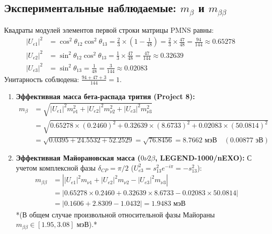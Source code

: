 \documentclass[12pt,a4paper]{article}
\begin{document}
	\subsection{Экспериментальные наблюдаемые: $m_\beta$ и $m_{\beta\beta}$}
	Квадраты модулей элементов первой строки матрицы PMNS равны:
	\begin{align}
		|U_{e1}|^2 &= \cos^2\theta_{12} \cos^2\theta_{13} = \frac{2}{3} \times \left(1 - \frac{1}{48}\right) = \frac{2}{3} \times \frac{47}{48} = \frac{94}{144} \approx \mathbf{0.65278} \\
		|U_{e2}|^2 &= \sin^2\theta_{12} \cos^2\theta_{13} = \frac{1}{3} \times \frac{47}{48} = \frac{47}{144} \approx \mathbf{0.32639} \\
		|U_{e3}|^2 &= \sin^2\theta_{13} = \frac{1}{48} = \frac{3}{144} \approx \mathbf{0.02083}
	\end{align}
	Унитарность соблюдена: $\frac{94 + 47 + 3}{144} = 1$.
	
	\begin{enumerate}
		\item \textbf{Эффективная масса бета-распада трития (Project 8):}
		\begin{align}
			m_\beta &= \sqrt{|U_{e1}|^2 m_{\nu 1}^2 + |U_{e2}|^2 m_{\nu 2}^2 + |U_{e3}|^2 m_{\nu 3}^2} \nonumber \\
			&= \sqrt{0.65278 \times (0.2460)^2 + 0.32639 \times (8.6733)^2 + 0.02083 \times (50.0814)^2} \nonumber \\
			&= \sqrt{0.0395 + 24.5532 + 52.2529} = \sqrt{76.8456} = \mathbf{8.7662 \text{ мэВ}} \quad (0.00877 \text{ эВ})
		\end{align}
		
		\item \textbf{Эффективная Майорановская масса ($0\nu 2\beta$, LEGEND-1000/nEXO):}
		С учетом комплексной фазы $\delta_{CP} = \pi/2$ ($U_{e3}^2 = s_{13}^2 e^{-i\pi} = -s_{13}^2$):
		\begin{align}
			m_{\beta\beta} &= \left| |U_{e1}|^2 m_{\nu 1} + |U_{e2}|^2 m_{\nu 2} - |U_{e3}|^2 m_{\nu 3} \right| \nonumber \\
			&= \left| 0.65278 \times 0.2460 + 0.32639 \times 8.6733 - 0.02083 \times 50.0814 \right| \nonumber \\
			&= |0.1606 + 2.8309 - 1.0432| = \mathbf{1.9483 \text{ мэВ}}
		\end{align}
		*(В общем случае произвольной относительной фазы Майораны $m_{\beta\beta} \in [1.95, 3.08]$ мэВ).*
	\end{enumerate}
	
\end{document}
